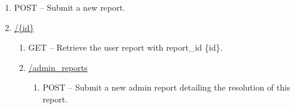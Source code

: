 \documentclass[12pt,letterpaper]{article}
\begin{document}
\begin{myEnumerate}
\begin{myEnumerate}
\begin{enumerate}
\item[] POST -- Submit a new report.
\item[] \url{/{id}}
\begin{enumerate}
\item[] GET -- Retrieve the user report with report\_id \{id\}.
\item[] \url{/admin_reports}
\begin{enumerate}
\item[] POST -- Submit a new admin report detailing the resolution of this report.
\end{enumerate}
\end{enumerate}
\end{enumerate}
\end{myEnumerate}
\end{myEnumerate}
\end{document}
